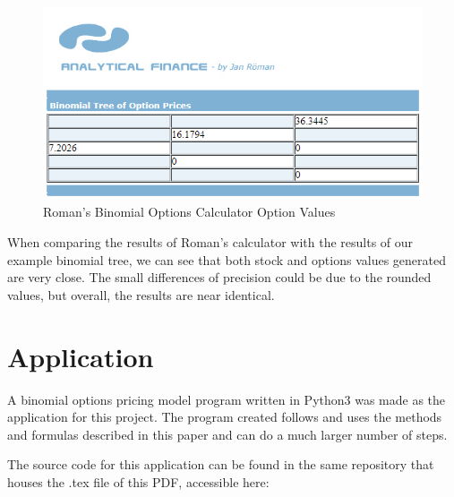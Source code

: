 \documentclass[12pt, letterpaper]{article}\usepackage{float}
\begin{document}
\begin{figure}[H]
  \includegraphics{Roman_binomial_calculator_option_values}
  \caption{Roman's Binomial Options Calculator Option Values}
\end{figure}

When comparing the results of Roman's calculator with the results of our example binomial tree, we can see that both stock and options values generated are very close.
The small differences of precision could be due to the rounded values, but overall, the results are near identical.

\section*{Application}
A binomial options pricing model program written in Python3 was made as the application for this project.
The program created follows and uses the methods and formulas described in this paper and can do a much larger number of steps.

The source code for this application can be found in the same repository that houses the .tex file of this PDF, accessible here:

\href{https://github.com/cliuj/binomial-options-pricing-model}{\color{blue}{https://github.com/cliuj/binomial-options-pricing-model}}
\end{document}
